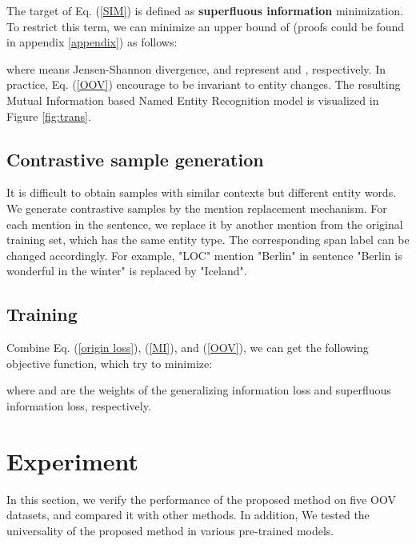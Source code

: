 \documentclass[11pt]{article}
\begin{document}
The target of Eq. (\ref{SIM}) is defined as \textbf{superfluous information} minimization. To restrict this term, we can minimize an upper bound of  (proofs could be found in appendix \ref{appendix}) as follows:



where  means Jensen-Shannon divergence,  and  represent  and , respectively. In practice, Eq. (\ref{OOV}) encourage  to be invariant to entity changes.
The resulting Mutual Information based Named Entity Recognition model is visualized in Figure \ref{fig:trans}.

 \subsection{Contrastive sample generation}
It is difficult to obtain samples with similar contexts but different entity words. We generate contrastive samples by the mention replacement mechanism\cite{dai2020analysis}. For each mention in the sentence, we replace it by another mention from the original training set, which has the same entity type. The corresponding span label can be changed accordingly. For example, "LOC" mention "Berlin" in sentence "Berlin is wonderful in the winter" is replaced by "Iceland". 

\subsection{Training}
Combine Eq. (\ref{origin loss}), (\ref{MI}), and (\ref{OOV}), we can get the following objective function, which try to minimize:

 

where  and  are the weights of the generalizing information loss and superfluous information loss, respectively.


\section{Experiment}\label{Experiments}
In this section, we verify the performance of the proposed method on five OOV datasets, and compared it with other methods. In addition, We tested the universality of the proposed method in various pre-trained models.
\end{document}
